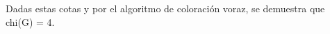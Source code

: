 \documentclass[preview]{standalone}
\begin{document}
\begin{center}
Dadas estas cotas y por el algoritmo de coloración voraz, se demuestra que \\chi(G) = 4.
\end{center}
\end{document}
